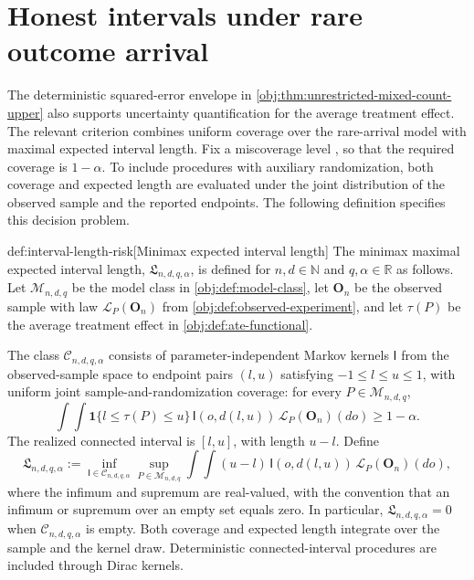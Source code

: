 \section{Honest intervals under rare outcome arrival}

The deterministic squared-error envelope in \cref{obj:thm:unrestricted-mixed-count-upper} also supports uncertainty quantification for the average treatment effect. The relevant criterion combines uniform coverage over the rare-arrival model with maximal expected interval length. Fix a miscoverage level , so that the required coverage is \(1-\alpha\). To include procedures with auxiliary randomization, both coverage and expected length are evaluated under the joint distribution of the observed sample and the reported endpoints. The following definition specifies this decision problem.

\begin{definitionv}{def:interval-length-risk}[Minimax expected interval length]
The minimax maximal expected interval length, \(\mathfrak L_{n,d,q,\alpha}\), is defined for \(n,d\in\mathbb N\) and \(q,\alpha\in\mathbb R\) as follows. Let \(\mathcal M_{n,d,q}\) be the model class in \cref{obj:def:model-class}, let \(\mathbf O_n\) be the observed sample with law \(\mathcal L_P(\mathbf O_n)\) from \cref{obj:def:observed-experiment}, and let \(\tau(P)\) be the average treatment effect in \cref{obj:def:ate-functional}.

The class \(\mathcal C_{n,d,q,\alpha}\) consists of parameter-independent Markov kernels \(\mathsf I\) from the observed-sample space to endpoint pairs \((l,u)\) satisfying \(-1\le l\le u\le1\), with uniform joint sample-and-randomization coverage: for every \(P\in\mathcal M_{n,d,q}\),
\[
\int\!\int
\mathbf1\{l\le\tau(P)\le u\}\,
\mathsf I(o,d(l,u))\,
\mathcal L_P(\mathbf O_n)(do)
\ge 1-\alpha.
\]
The realized connected interval is \([l,u]\), with length \(u-l\). Define
\[
\mathfrak L_{n,d,q,\alpha}
:=
\inf_{\mathsf I\in\mathcal C_{n,d,q,\alpha}}
\sup_{P\in\mathcal M_{n,d,q}}
\int\!\int (u-l)\,
\mathsf I(o,d(l,u))\,
\mathcal L_P(\mathbf O_n)(do),
\]
where the infimum and supremum are real-valued, with the convention that an infimum or supremum over an empty set equals zero. In particular, \(\mathfrak L_{n,d,q,\alpha}=0\) when \(\mathcal C_{n,d,q,\alpha}\) is empty. Both coverage and expected length integrate over the sample and the kernel draw. Deterministic connected-interval procedures are included through Dirac kernels.
\end{definitionv}

